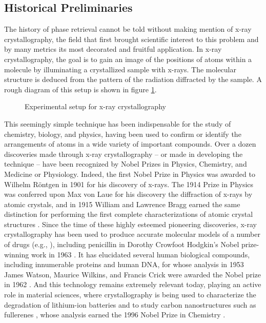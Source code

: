 \subsection{Historical Preliminaries}

The history of phase retrieval cannot be told without making mention of x-ray crystallography, the field that first brought scientific interest to this problem and by many metrics its most decorated and fruitful application.  In x-ray crystallography, the goal is to gain an image of the positions of atoms within a molecule by illuminating a crystallized sample with x-rays.  The molecular structure is deduced from the pattern of the radiation diffracted by the sample.  A rough diagram of this setup is shown in figure \ref{fig:xray_cryst}.

\begin{figure}
  \begin{center}
  \end{center}
  \caption{Experimental setup for x-ray crystallography}
  \label{fig:xray_cryst}
\end{figure}

This seemingly simple technique has been indispensable for the study of chemistry, biology, and physics, having been used to confirm or identify the arrangements of atoms in a wide variety of important compounds.  Over a dozen discoveries made through x-ray crystallography -- or made in developing the technique -- have been recognized by Nobel Prizes in Physics, Chemistry, and Medicine or Physiology.  Indeed, the first Nobel Prize in Physics was awarded to Wilhelm R\"ontgen in 1901 for his discovery of x-rays.  The 1914 Prize in Physics was conferred upon Max von Laue for his discovery the diffraction of x-rays by atomic crystals, and in 1915 William and Lawrence Bragg earned the same distinction for performing the first complete characterizations of atomic crystal structures \cite{galli2014nobel}.  Since the time of these highly esteemed pioneering discoveries, x-ray crystallography has been used to produce accurate molecular models of a number of drugs (e.g., \cite{cell2001antibios, rasmussen2007adrenergic, schindler2000kinase}), including penicillin in Dorothy Crowfoot Hodgkin's Nobel prize-winning work in 1963 \cite{hodgkin1963penicillin}.  It has elucidated several human biological compounds, including innumerable proteins \cite{kimber2003protein, varsani1993isomerase} and human DNA, for whose analysis in 1953 James Watson, Maurice Wilkins, and Francis Crick were awarded the Nobel prize in 1962 \cite{watson1962nobel_lecture}.  And this technology remains extremely relevant today, playing an active role in material sciences, where crystallography is being used to characterize the degradation of lithium-ion batteries \cite{hausbrand2015battery, andrej2018battery} and to study carbon nanostructures such as fullerenes \cite{lamb1990carbon, kroto1985fullerene}, whose analysis earned the 1996 Nobel Prize in Chemistry \cite{galli2014nobel}.

